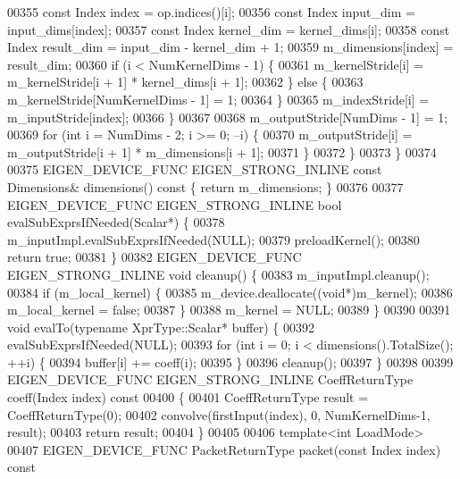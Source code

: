 \begin{DoxyCode}
00355         \textcolor{keyword}{const} Index index = op.indices()[i];
00356         \textcolor{keyword}{const} Index input\_dim = input\_dims[index];
00357         \textcolor{keyword}{const} Index kernel\_dim = kernel\_dims[i];
00358         \textcolor{keyword}{const} Index result\_dim = input\_dim - kernel\_dim + 1;
00359         m\_dimensions[index] = result\_dim;
00360         \textcolor{keywordflow}{if} (i < NumKernelDims - 1) \{
00361           m\_kernelStride[i] = m\_kernelStride[i + 1] * kernel\_dims[i + 1];
00362         \} \textcolor{keywordflow}{else} \{
00363           m\_kernelStride[NumKernelDims - 1] = 1;
00364         \}
00365         m\_indexStride[i] = m\_inputStride[index];
00366       \}
00367 
00368       m\_outputStride[NumDims - 1] = 1;
00369       \textcolor{keywordflow}{for} (\textcolor{keywordtype}{int} i = NumDims - 2; i >= 0; --i) \{
00370         m\_outputStride[i] = m\_outputStride[i + 1] * m\_dimensions[i + 1];
00371       \}
00372     \}
00373   \}
00374 
00375   EIGEN\_DEVICE\_FUNC EIGEN\_STRONG\_INLINE \textcolor{keyword}{const} Dimensions& dimensions()\textcolor{keyword}{ const }\{ \textcolor{keywordflow}{return} m\_dimensions; \}
00376 
00377   EIGEN\_DEVICE\_FUNC EIGEN\_STRONG\_INLINE \textcolor{keywordtype}{bool} evalSubExprsIfNeeded(Scalar*) \{
00378     m\_inputImpl.evalSubExprsIfNeeded(NULL);
00379     preloadKernel();
00380     \textcolor{keywordflow}{return} \textcolor{keyword}{true};
00381   \}
00382   EIGEN\_DEVICE\_FUNC EIGEN\_STRONG\_INLINE \textcolor{keywordtype}{void} cleanup() \{
00383     m\_inputImpl.cleanup();
00384     \textcolor{keywordflow}{if} (m\_local\_kernel) \{
00385       m\_device.deallocate((\textcolor{keywordtype}{void}*)m\_kernel);
00386       m\_local\_kernel = \textcolor{keyword}{false};
00387     \}
00388     m\_kernel = NULL;
00389   \}
00390 
00391   \textcolor{keywordtype}{void} evalTo(\textcolor{keyword}{typename} XprType::Scalar* buffer) \{
00392     evalSubExprsIfNeeded(NULL);
00393     \textcolor{keywordflow}{for} (\textcolor{keywordtype}{int} i = 0; i < dimensions().TotalSize(); ++i) \{
00394       buffer[i] += coeff(i);
00395     \}
00396     cleanup();
00397   \}
00398 
00399   EIGEN\_DEVICE\_FUNC EIGEN\_STRONG\_INLINE CoeffReturnType coeff(Index index)\textcolor{keyword}{ const}
00400 \textcolor{keyword}{  }\{
00401     CoeffReturnType result = CoeffReturnType(0);
00402     convolve(firstInput(index), 0, NumKernelDims-1, result);
00403     \textcolor{keywordflow}{return} result;
00404   \}
00405 
00406   \textcolor{keyword}{template}<\textcolor{keywordtype}{int} LoadMode>
00407   EIGEN\_DEVICE\_FUNC PacketReturnType packet(\textcolor{keyword}{const} Index index)\textcolor{keyword}{ const}

\end{DoxyCode}
